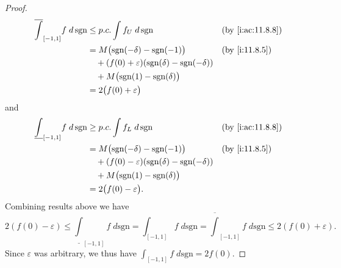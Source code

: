 \begin{proof}
\begin{align*}
    \overline{\int}_{[-1, 1]} f \; d \, \text{sgn} & \leq p.c. \int f_U \; d \, \text{sgn}                                   &  & \by{i:ac:11.8.8} \\
                                                   & = M \big(\text{sgn}(-\delta) - \text{sgn}(-1)\big)                      &  & \by{i:11.8.5}    \\
                                                   & \quad + (f(0) + \varepsilon) (\text{sgn}(\delta) - \text{sgn}(-\delta))                       \\
                                                   & \quad + M \big(\text{sgn}(1) - \text{sgn}(\delta)\big)                                        \\
                                                   & = 2\big(f(0) + \varepsilon\big)
  \end{align*}
  and
  \begin{align*}
    \underline{\int}_{[-1, 1]} f \; d \, \text{sgn} & \geq p.c. \int f_L \; d \, \text{sgn}                                   &  & \by{i:ac:11.8.8} \\
                                                    & = M \big(\text{sgn}(-\delta) - \text{sgn}(-1)\big)                      &  & \by{i:11.8.5}    \\
                                                    & \quad + (f(0) - \varepsilon) (\text{sgn}(\delta) - \text{sgn}(-\delta))                       \\
                                                    & \quad + M \big(\text{sgn}(1) - \text{sgn}(\delta)\big)                                        \\
                                                    & = 2\big(f(0) - \varepsilon\big).
  \end{align*}
  Combining results above we have
  \[
    2(f(0) - \varepsilon) \leq \underline{\int}_{[-1, 1]} f \; d \text{sgn} = \int_{[-1, 1]} f \; d \text{sgn} = \overline{\int}_{[-1, 1]} f \; d \text{sgn} \leq 2(f(0) + \varepsilon).
  \]
  Since \(\varepsilon\) was arbitrary, we thus have \(\int_{[-1, 1]} f \; d \text{sgn} = 2f(0)\).
\end{proof}
